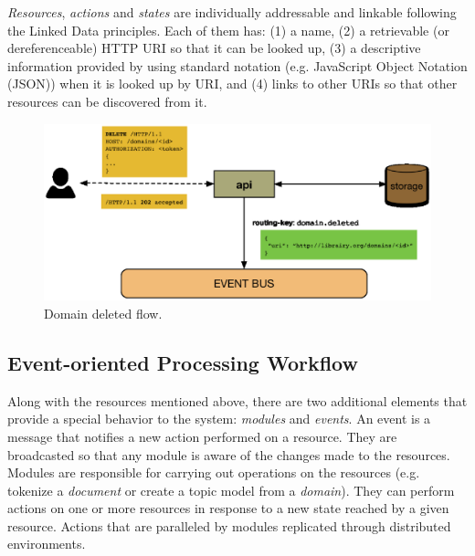 \textit{Resources}, \textit{actions} and \textit{states} are individually addressable and linkable \cite{Turchi2012a} following the Linked Data principles\cite{Bizer2009}. Each of them has: (1) a name, (2) a retrievable (or dereferenceable) HTTP URI so that it can be looked up, (3) a descriptive information provided by using standard notation (e.g. JavaScript Object Notation (JSON)) when it is  looked up by URI, and (4) links to other URIs so that other resources can be discovered from it.


\begin{figure}
  \includegraphics[scale=0.35]{api-domain-deleted}
  \caption{Domain deleted flow.}
  \label{fig:librairy-domain-deleted}
\end{figure}


\subsection{Event-oriented Processing Workflow}

Along with the resources mentioned above, there are two additional elements that provide a special behavior to the system: \textit{modules} and \textit{events}. An event is a message that notifies a new action performed on a resource. They are broadcasted so that any module is aware of the changes made to the resources. Modules are responsible for carrying out operations on the resources (e.g. tokenize a \textit{document} or create a topic model from a \textit{domain}). They can perform actions on one or more resources in response to a new state reached by a given resource. Actions that are paralleled by modules replicated through distributed environments.

